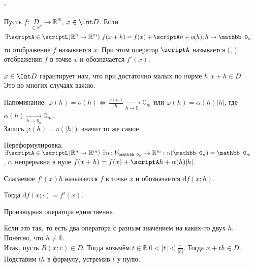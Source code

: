 \documentclass{article}
\begin{document}
    \paragraph{.}
    \begin{itemize}
        \dfn Пусть $f\colon \underset{{\subset\mathbb R^n}}D\to\mathbb R^m$, $x\in\Int D$. Если
        $$\exists\scriptA\in\scriptL(\mathbb R^n\to\mathbb R^m)~f(x+h)=f(x)+\scriptA h+o(h);h\to\mathbb 0_n$$
        то отображение $f$ называется  $x$. При этом оператор $\scriptA$ называется  (, ) отображения $f$ в точке $x$ и обозначается $f'(x)$.
        \pagebreak
        \begin{Comment}
            $x\in\Int D$ гарантирует нам, что при достаточно малых по норме $h$ $x+h\in D$. Это во многих случаях важно.
        \end{Comment}
        \begin{Comment}
            Напоминание: $\varphi(h)=o(h)\Leftrightarrow\frac{\varphi(h)}{|h|}\underset{h\to\mathbb0_n}\longrightarrow\mathbb0_m$ или $\varphi(h)=\alpha(h)|h|$, где $\alpha(h)\underset{h\to\mathbb0_n}\longrightarrow\mathbb0_m$.\\
           Запись $\varphi(h)=o(|h|)$ значит то же самое.
        \end{Comment}
        \begin{Comment}
            Переформулировка: $\exists\scriptA\in\scriptL(\mathbb R^n\to\mathbb R^m)~\exists\alpha\colon V_{\mathbb0_n}\to\mathbb R^m:\alpha(\mathbb 0_n)=\mathbb0_m$, $\alpha$ непрерывна в нуле $f(x+h)=f(x)+\scriptA h+\alpha(h)|h|$.
        \end{Comment}
        \dfn Слагаемое $f'(x)h$ называется  $f$ в точке $x$ и обозначается $\mathrm df(x;h)$.
        \begin{Comment}
            Тогда $\mathrm df(x;\cdot)=f'(x)$.
        \end{Comment}
        \thm Производная оператора единственна.
        \begin{Proof}
            Если это так, то есть два оператора с разным значением на каких-то двух $h$. Понятно, что $h\neq\mathbb0$.\\
            Итак, пусть $B(x;r)\in D$. Тогда возьмём $t\in\mathbb R~0<|t|<\frac r{|h|}$. Тогда $x+th\in D$. Подставим $th$ в формулу, устремив $t$ у нулю:

\end{Proof}
\end{itemize}
\end{document}

